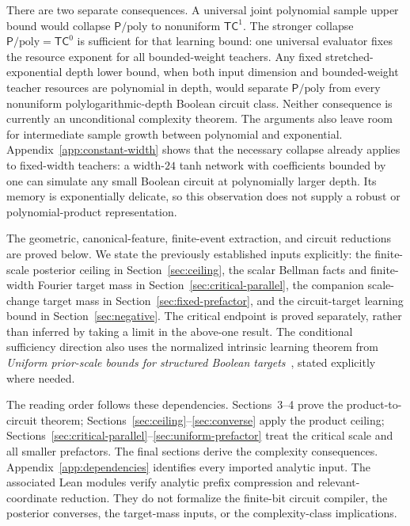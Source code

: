 \documentclass[11pt]{article}
\theoremstyle{remark}
\newcommand{\TC}{\mathsf{TC}}
\newcommand{\Ppoly}{\mathsf{P}/\mathrm{poly}}
\begin{document}
There are two separate consequences. A universal joint polynomial
sample upper bound would collapse $\Ppoly$ to nonuniform $\TC^1$.
The stronger collapse $\Ppoly=\TC^0$ is sufficient for that
learning bound: one universal evaluator fixes the resource
exponent for all bounded-weight teachers.
Any fixed stretched-exponential depth lower bound, when both input dimension and
bounded-weight teacher resources are polynomial in depth, would
separate $\Ppoly$ from every nonuniform polylogarithmic-depth Boolean
circuit class. Neither consequence is currently an unconditional
complexity theorem. The arguments also leave room for intermediate
sample growth between polynomial and exponential.
Appendix~\ref{app:constant-width} shows that the necessary collapse
already applies to fixed-width teachers: a width-$24$ tanh network with coefficients bounded by one can simulate any small Boolean circuit at polynomially
larger depth. Its memory is exponentially delicate, so this observation
does not supply a robust or polynomial-product representation.

The geometric, canonical-feature, finite-event extraction, and
circuit reductions are proved below. We state the previously established
inputs explicitly: the finite-scale posterior ceiling in
Section~\ref{sec:ceiling}, the scalar Bellman facts and finite-width
Fourier target mass in Section~\ref{sec:critical-parallel}, the companion
scale-change target mass in Section~\ref{sec:fixed-prefactor}, and the
circuit-target learning bound in Section~\ref{sec:negative}. The
critical endpoint is proved separately, rather than inferred by taking
a limit in the above-one result.
The conditional sufficiency direction also uses the normalized intrinsic
learning theorem from \emph{Uniform prior-scale bounds for structured
Boolean targets}~\cite{uniformtargets}, stated explicitly where needed.

The reading order follows these dependencies. Sections~3--4 prove the
product-to-circuit theorem; Sections~\ref{sec:ceiling}--\ref{sec:converse}
apply the product ceiling; Sections~\ref{sec:critical-parallel}--\ref{sec:uniform-prefactor}
treat the critical scale and all smaller prefactors. The final sections
derive the complexity consequences. Appendix~\ref{app:dependencies}
identifies every imported analytic input. The associated Lean modules
verify analytic prefix compression and relevant-coordinate reduction.
They do not formalize the finite-bit circuit compiler, the posterior
converses, the target-mass inputs, or the complexity-class implications.
\end{document}

